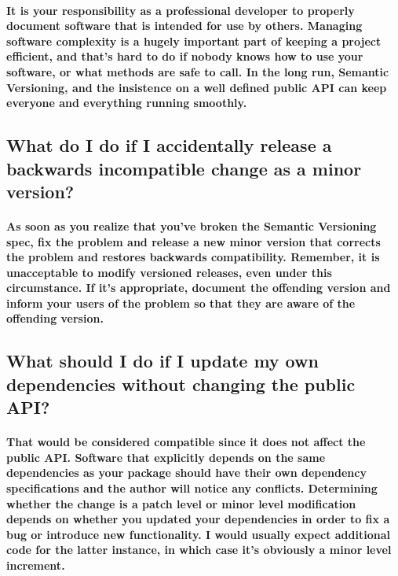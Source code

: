\paragraph{
It is your responsibility as a professional developer to properly document software 
that is intended for use by others. Managing software complexity is a hugely important 
part of keeping a project efficient, and that's hard to do if nobody knows how to 
use your software, or what methods are safe to call. In the long run, Semantic 
Versioning, and the insistence on a well defined public API can keep everyone 
and everything running smoothly.
}

\subsection{ What do I do if I accidentally release a backwards incompatible change as a minor version? }

\paragraph{
As soon as you realize that you've broken the Semantic Versioning spec, fix the 
problem and release a new minor version that corrects the problem and restores 
backwards compatibility. Remember, it is unacceptable to modify versioned releases, 
even under this circumstance. If it's appropriate, document the offending version 
and inform your users of the problem so that they are aware of the offending version.
}

\subsection{ What should I do if I update my own dependencies without changing the public API? }

\paragraph{
That would be considered compatible since it does not affect the public API. Software
that explicitly depends on the same dependencies as your package should have their 
own dependency specifications and the author will notice any conflicts. Determining 
whether the change is a patch level or minor level modification depends on whether you 
updated your dependencies in order to fix a bug or introduce new functionality. I 
would usually expect additional code for the latter instance, in which case it's 
obviously a minor level increment.
}

